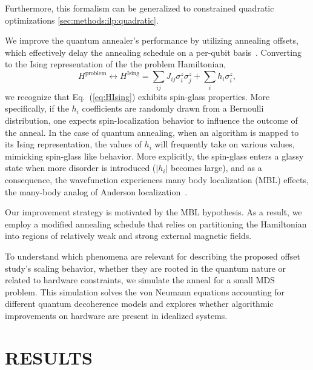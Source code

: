 \documentclass[prd,twocolumn,tightenlines,preprintnumbers,showpacs,superscriptaddress,notitlepage,nofootinbib,eqsecnum,floatfix,longbibliography,aps,10pt]{revtex4-1}
\begin{document}
Furthermore, this formalism can be generalized to constrained quadratic optimizations \ref{sec:methods:ilp:quadratic}.

We improve the quantum annealer's performance by utilizing annealing offsets, which effectively delay the annealing schedule on a per-qubit basis~\cite{PhysRevA.96.042322,hsu2018quantum,10.1007/978-3-030-14082-3_14,2020RPPh...83e4401H}.
Converting to the Ising representation of the the problem Hamiltonian,
\begin{equation}
    \label{eq:HIsing}
     H^{\textrm{problem}} \leftrightarrow H^{\textrm{Ising}} = \sum_{ij} J_{ij} \sigma^z_i \sigma^z_j + \sum_i h_i \sigma^z_i ,
\end{equation}
we recognize that Eq.~(\ref{eq:HIsing}) exhibits spin-glass properties. More specifically, if the $h_i$ coefficients are randomly drawn from a Bernoulli distribution, one expects spin-localization behavior to influence the outcome of the anneal.
In the case of quantum annealing, when an algorithm is mapped to its Ising representation, the values of $h_i$ will frequently take on various values, mimicking spin-glass like behavior.
More explicitly, the spin-glass enters a glassy state when more disorder is introduced ($|h_i|$ becomes large), and as a consequence, the wavefunction experiences many body localization (MBL) effects, the many-body analog of Anderson localization~\cite{doi:10.1146/annurev-conmatphys-031214-014726,PhysRevE.90.022103,RevModPhys.91.021001,ALET2018498,PhysRevB.82.174411,PhysRevLett.109.017202}.

Our improvement strategy is motivated by the MBL hypothesis.
As a result, we employ a modified annealing schedule that relies on partitioning the Hamiltonian into regions of relatively weak and strong external magnetic fields.


To understand which phenomena are relevant for describing the proposed offset study's scaling behavior, whether they are rooted in the quantum nature or related to hardware constraints, we simulate the anneal for a small MDS problem. This simulation solves the von Neumann equations accounting for different quantum decoherence models and explores whether algorithmic improvements on hardware are present in idealized systems.

\section{RESULTS}
\label{sec:results}
\end{document}

